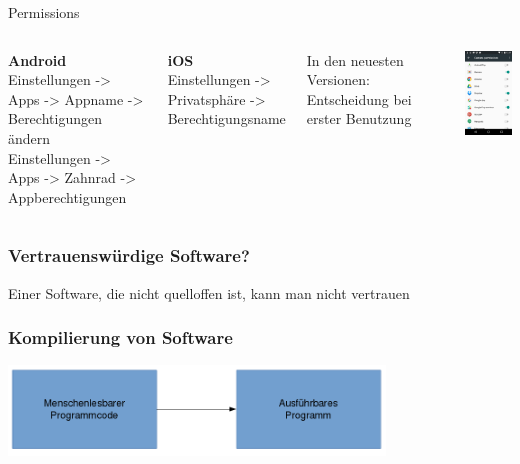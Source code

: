 \documentclass[12pt, xcolor={svgnames,table}]{beamer}
\begin{document}
\begin{frame}{Permissions}
  \begin{columns}
    \column{5.5cm}
    \footnotesize

    \textbf{Android}\\
    Einstellungen -> Apps -> Appname -> Berechtigungen ändern\\
    \vspace{0.2cm}
    Einstellungen -> Apps -> Zahnrad -> Appberechtigungen\\
    \vspace{0.5cm}

    \textbf{iOS}\\
    Einstellungen -> Privatsphäre -> Berechtigungsname\\
    \vspace{0.5cm}

    In den neuesten Versionen: Entscheidung bei erster Benutzung

    \column{5cm}

    \begin{center}
      \includegraphics[width=3.5cm]{img/permissions-android.png}
    \par\end{center}
  \end{columns}
\end{frame}

\begin{frame}
    \frametitle{Vertrauenswürdige Software?}
    \begin{center}\Large
        Einer Software, die nicht quelloffen ist, kann man nicht vertrauen
    \end{center}
\end{frame}

\begin{frame}
  \frametitle{Kompilierung von Software}
  \begin{center}
    \includegraphics[width=10cm]{img/compilation-process}
  \par\end{center}
\end{frame}
\end{document}
